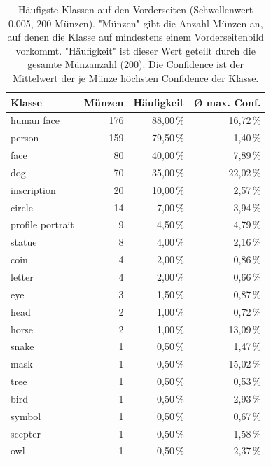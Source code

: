 \begin{table}[H]
\centering
\caption{Häufigste Klassen auf den Vorderseiten (Schwellenwert 0{,}005, 200 Münzen). "Münzen" gibt die Anzahl Münzen an, auf denen die Klasse auf mindestens einem Vorderseitenbild vorkommt. "Häufigkeit" ist dieser Wert geteilt durch die gesamte Münzanzahl (200). Die Confidence ist der Mittelwert der je Münze höchsten Confidence der Klasse.}
\label{tab:klassenhaeufigkeit}
\begin{tabular}{|l|r|r|r|}
\hline
\textbf{Klasse} & \textbf{Münzen} & \textbf{Häufigkeit} & \textbf{Ø max. Conf.} \\ \hline
human face       & 176 & 88{,}00\,\% & 16{,}72\,\% \\ \hline
person           & 159 & 79{,}50\,\% & 1{,}40\,\%  \\ \hline
face             & 80  & 40{,}00\,\% & 7{,}89\,\%  \\ \hline
dog              & 70  & 35{,}00\,\% & 22{,}02\,\% \\ \hline
inscription      & 20  & 10{,}00\,\% & 2{,}57\,\%  \\ \hline
circle           & 14  & 7{,}00\,\%  & 3{,}94\,\%  \\ \hline
profile portrait & 9   & 4{,}50\,\%  & 4{,}79\,\%  \\ \hline
statue           & 8   & 4{,}00\,\%  & 2{,}16\,\%  \\ \hline
coin             & 4   & 2{,}00\,\%  & 0{,}86\,\%  \\ \hline
letter           & 4   & 2{,}00\,\%  & 0{,}66\,\%  \\ \hline
eye              & 3   & 1{,}50\,\%  & 0{,}87\,\%  \\ \hline
head             & 2   & 1{,}00\,\%  & 0{,}72\,\%  \\ \hline
horse            & 2   & 1{,}00\,\%  & 13{,}09\,\% \\ \hline
snake            & 1   & 0{,}50\,\%  & 1{,}47\,\%  \\ \hline
mask             & 1   & 0{,}50\,\%  & 15{,}02\,\% \\ \hline
tree             & 1   & 0{,}50\,\%  & 0{,}53\,\%  \\ \hline
bird             & 1   & 0{,}50\,\%  & 2{,}93\,\%  \\ \hline
symbol           & 1   & 0{,}50\,\%  & 0{,}67\,\%  \\ \hline
scepter          & 1   & 0{,}50\,\%  & 1{,}58\,\%  \\ \hline
owl              & 1   & 0{,}50\,\%  & 2{,}37\,\%  \\ \hline
\end{tabular}
\end{table}

